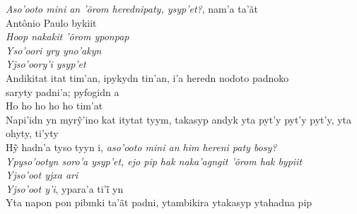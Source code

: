 \begin{linenumbers}

\noindent   \textit{Aso'ooto mini an 'õrom herednipaty, ysyp'et?}, nam'a ta'ãt\\
 Antônio Paulo bykiit\\
  \textit{Hoop nakakit 'õrom yponpap}\\
  \textit{Yso'oori yry yno'akyn}\\
  \textit{Yjso'oory'i ysyp'et}\\
  Andikitat itat tim'an, ipykydn tin'an, i'a heredn nodoto padnoko\\
 saryty padni'a; pyfogidn a\\
  Ho ho ho ho ho tim'at\\
  Napi’idn yn myrỹ’ino kat itytat tyym, takasyp andyk yta pyt’y pyt’y pyt’y, yta ohyty, ti’yty\\
  Hỹ hadn’a tyso tyyn i, \textit{aso’ooto mini an him hereni paty bosy?}\\
  \textit{Ypyso'ootyn soro'a ysyp'et, ejo pip hak naka'agngit 'õrom hak bypiit}\\
  \textit{Yjso'oot yjxa ari}\\
  \textit{Yjso’oot y’i}, ypara’a ti’ĩ yn\\
  Yta napon pon pibmki ta'ãt padni, ytambikira ytakasyp ytahadna pip

\end{linenumbers}

\bigskip


